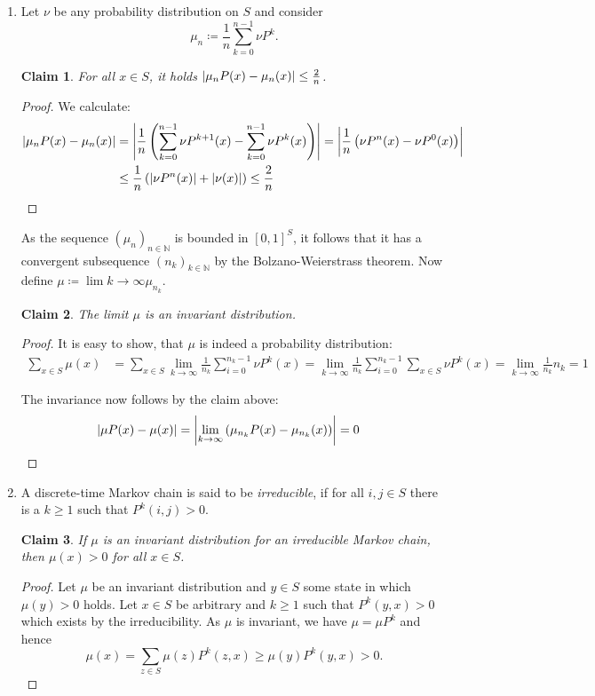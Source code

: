 \documentclass[a4paper]{amsart}
\theoremstyle{theorem}
\newtheorem{claim}{Claim}
\theoremstyle{definition}
\newcommand{\N}{\mathbb{N}}
\DeclarePairedDelimiter\abs{\lvert}{\rvert}%
\begin{document}
\begin{enumerate}[label=\alph*)]
\item Let $\nu$ be any probability distribution on $S$ and consider $$\mu_n\coloneqq \frac{1}{n} \sum_{k=0}^{n-1} \nu P^{k}.$$

\begin{claim}
	For all $x\in S$, it holds $\abs*{\mu_nP(x) - \mu_n(x)} \leq \frac{2}{n}$.
\end{claim}
\begin{proof}
	We calculate:
	\begin{align*}
		\abs{\mu_n P(x) - \mu_n (x)}
		&= \abs*{\frac{1}{n} \left( \sum_{k=0}^{n-1}\nu P^{k+1}(x) - \sum_{k=0}^{n-1}\nu P^k(x) \right)}
		= \abs*{\frac{1}{n} \left( \nu P^n(x) -\nu P^0(x) \right)} \\
		&\leq \frac{1}{n} \left( \abs*{\nu P^n (x)} + \abs*{\nu(x)} \right)
		\leq \frac{2}{n}
	\end{align*}
\end{proof}

As the sequence $(\mu_n)_{n\in\N}$ is bounded in $[0,1]^S$, it follows that it has a convergent subsequence $(n_k)_{k\in\N}$ by the Bolzano-Weierstrass theorem.
Now define $\mu \coloneqq \lim{k\to\infty} \mu_{n_k}$.
\begin{claim}
	The limit $\mu$ is an invariant distribution.
\end{claim} 
\begin{proof}
	It is easy to show, that $\mu$ is indeed a probability distribution:
	\begin{align*}
		\sum_{x\in S} \mu(x)
		&= \sum_{x\in S} \lim_{k\to\infty} \frac{1}{n_k} \sum_{i=0}^{n_k - 1} \nu P^k (x)
		= \lim_{k\to\infty} \frac{1}{n_k} \sum_{i=0}^{n_k - 1} \sum_{x\in S} \nu P^k(x)
		= \lim_{k\to\infty} \frac{1}{n_k} n_k = 1
	\end{align*}
	
	The invariance now follows by the claim above:
	\begin{align*}
		\abs*{ \mu P(x) - \mu(x) }
		&= \abs*{ \lim_{k\to\infty} \left(  \mu_{n_k}P (x) - \mu_{n_k} (x)  \right) } = 0
	\end{align*}
\end{proof}

\pagebreak

\item A discrete-time Markov chain is said to be \emph{irreducible}, if for all $i,j\in S$ there is a $k\geq 1$ such that $P^k(i,j) > 0$.

\begin{claim}
	If $\mu$ is an invariant distribution for an irreducible Markov chain, then $\mu(x) > 0$ for all $x\in S$.
\end{claim}
\begin{proof}
	Let $\mu$ be an invariant distribution and $y\in S$ some state in which $\mu(y) > 0$ holds.
	Let $x\in S$ be arbitrary and $k\geq 1$ such that $P^k(y,x) > 0$ which exists by the irreducibility.
	As $\mu$ is invariant, we have $\mu = \mu P^k$ and hence $$\mu(x) = \sum_{z\in S} \mu(z)P^k(z,x) \geq \mu(y) P^k(y,x) > 0.$$
\end{proof}



\end{enumerate}
\end{document}
